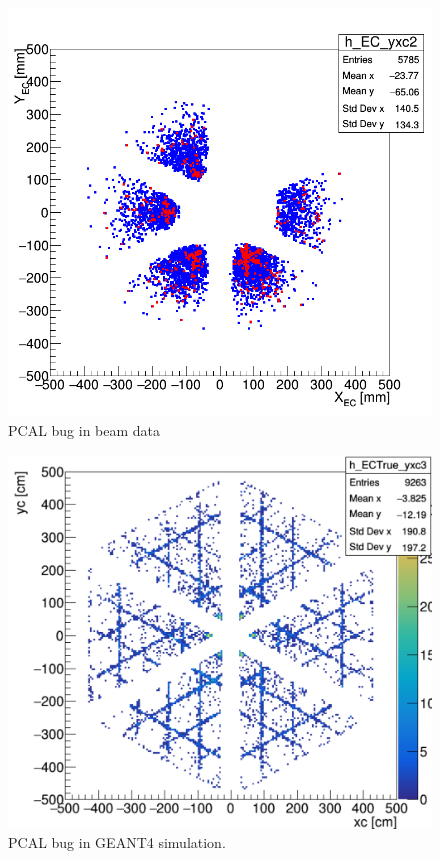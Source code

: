\begin{figure}[hbt]
	\centering
	\includegraphics[width=1.0\columnwidth,keepaspectratio]{img/PCAL_bug_data.png}
	\caption{PCAL bug in beam data}
	\label{fig:PCAL_bug_data}
\end{figure}

\begin{figure}[hbt]
	\centering
	\includegraphics[width=1.0\columnwidth,keepaspectratio]{img/PCAL_bug_hls.png}
	\caption{PCAL bug in GEANT4 simulation.}
	\label{fig:PCAL_bug_hls}
\end{figure}

